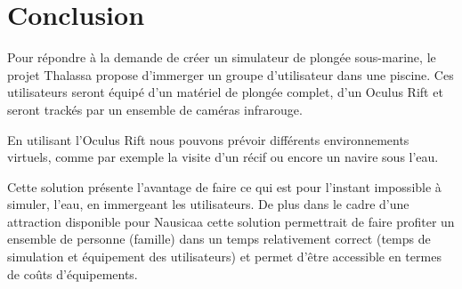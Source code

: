 \chapter{Conclusion}

Pour répondre à la demande de créer un simulateur de plongée sous-marine, le projet Thalassa propose d'immerger un groupe d’utilisateur dans une piscine. Ces utilisateurs seront équipé d’un matériel de plongée complet, d’un Oculus Rift et seront trackés par un ensemble de caméras infrarouge.


En utilisant l’Oculus Rift nous pouvons prévoir différents environnements virtuels, comme par exemple la visite d’un récif ou encore un navire sous l’eau.


Cette solution présente l’avantage de faire ce qui est pour l’instant impossible à simuler, l’eau,  en immergeant les utilisateurs. De plus dans le cadre d’une attraction disponible pour Nausicaa cette solution permettrait de faire profiter un ensemble de personne (famille) dans un temps relativement correct (temps de simulation et équipement des utilisateurs) et permet d'être accessible en termes de coûts d’équipements.
